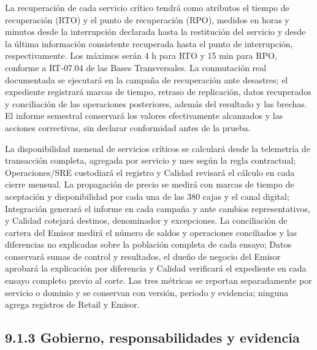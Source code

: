 \documentclass[11pt]{article}
\begin{document}
La recuperación de cada servicio crítico tendrá como atributos el tiempo de recuperación (RTO) y el punto de recuperación (RPO), medidos en horas y minutos desde la interrupción declarada hasta la restitución del servicio y desde la última información consistente recuperada hasta el punto de interrupción, respectivamente. Los máximos serán 4 h para RTO y 15 min para RPO, conforme a RT-07.04 de las Bases Transversales. La conmutación real documentada se ejecutará en la campaña de recuperación ante desastres; el expediente registrará marcas de tiempo, retraso de replicación, datos recuperados y conciliación de las operaciones posteriores, además del resultado y las brechas. El informe semestral conservará los valores efectivamente alcanzados y las acciones correctivas, sin declarar conformidad antes de la prueba.

La disponibilidad mensual de servicios críticos se calculará desde la telemetría de transacción completa, agregada por servicio y mes según la regla contractual; Operaciones/SRE custodiará el registro y Calidad revisará el cálculo en cada cierre mensual. La propagación de precio se medirá con marcas de tiempo de aceptación y disponibilidad por cada una de las 380 cajas y el canal digital; Integración generará el informe en cada campaña y ante cambios representativos, y Calidad cotejará destinos, denominador y excepciones. La conciliación de cartera del Emisor medirá el número de saldos y operaciones conciliados y las diferencias no explicadas sobre la población completa de cada ensayo; Datos conservará sumas de control y resultados, el dueño de negocio del Emisor aprobará la explicación por diferencia y Calidad verificará el expediente en cada ensayo completo previo al corte. Las tres métricas se reportan separadamente por servicio o dominio y se conservan con versión, período y evidencia; ninguna agrega registros de Retail y Emisor.

\subsection{9.1.3 Gobierno, responsabilidades y evidencia}
\end{document}
